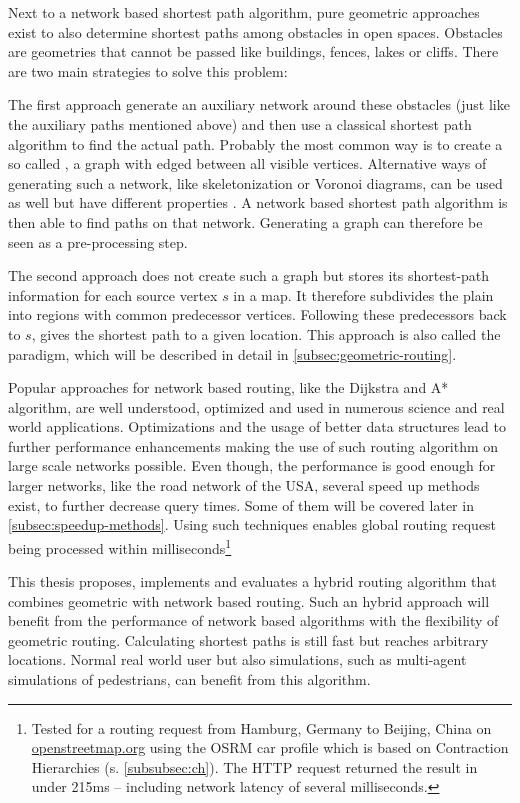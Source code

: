 Next to a network based shortest path algorithm, pure geometric approaches exist to also determine shortest paths among obstacles in open spaces.
Obstacles are geometries that cannot be passed like buildings, fences, lakes or cliffs.
There are two main strategies to solve this problem\cite[2]{hershberger-suri}:

The first approach generate an auxiliary network around these obstacles (just like the auxiliary paths mentioned above) and then use a classical shortest path algorithm to find the actual path.
Probably the most common way is to create a so called , a graph with edged between all visible vertices.
Alternative ways of generating such a network, like skeletonization or Voronoi diagrams, can be used as well but have different properties \cite[3-4]{graser-osm-open-spaces}.
A network based shortest path algorithm is then able to find paths on that network\cite[2]{hershberger-suri}.
Generating a graph can therefore be seen as a pre-processing step.

The second approach does not create such a graph but stores its shortest-path information for each source vertex $s$ in a map.
It therefore subdivides the plain into regions with common predecessor vertices.
Following these predecessors back to $s$, gives the shortest path to a given location.
This approach is also called the  paradigm, which will be described in detail in \cref{subsec:geometric-routing}.

Popular approaches for network based routing, like the Dijkstra and A* algorithm, are well understood, optimized and used in numerous science and real world applications.
Optimizations and the usage of better data structures lead to further performance enhancements making the use of such routing algorithm on large scale networks possible.
Even though, the performance is good enough for larger networks, like the road network of the USA\cite[5]{aviram-optimizing-dijkstra}, several speed up methods exist, to further decrease query times.
Some of them will be covered later in \cref{subsec:speedup-methods}.
Using such techniques enables global routing request being processed within milliseconds\footnote{Tested for a routing request from Hamburg, Germany to Beijing, China on \href{https://www.openstreetmap.org/directions?engine=fossgis\_osrm\_car&route=53.55\%2C10.00\%3B39.91\%2C116.39}{openstreetmap.org} using the OSRM car profile which is based on Contraction Hierarchies (s. \cref{subsubsec:ch}). The HTTP request returned the result in under 215ms -- including network latency of several milliseconds.}

This thesis proposes, implements and evaluates a hybrid routing algorithm that combines geometric with network based routing.
Such an hybrid approach will benefit from the performance of network based algorithms with the flexibility of geometric routing.
Calculating shortest paths is still fast but reaches arbitrary locations.
Normal real world user but also simulations, such as multi-agent simulations of pedestrians, can benefit from this algorithm.